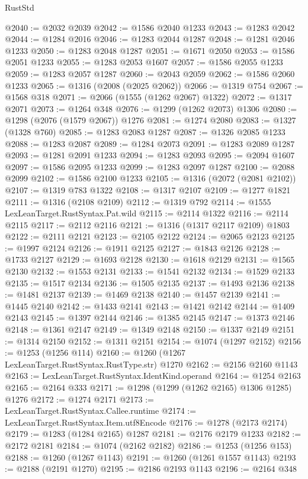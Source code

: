 \begin{lexlean}{RustStd}
\begin{coremodule}
@2040 := @2032 @2039
@2042 := @1586 @2040 @1233
@2043 := @1283 @2042
@2044 := @1284 @2016
@2046 := @1283 @2044 @1287
@2048 := @1281 @2046 @1233
@2050 := @1283 @2048 @1287
@2051 := @1671 @2050
@2053 := @1586 @2051 @1233
@2055 := @1283 @2053 @1607
@2057 := @1586 @2055 @1233
@2059 := @1283 @2057 @1287
@2060 := @2043 @2059
@2062 := @1586 @2060 @1233
@2065 := @1316 (@2008 (@2025 @2062))
@2066 := @1319 @754
@2067 := @1568 @318
@2071 := @2066 (@1555 (@1262 @2067) @1322)
@2072 := @1317 @2071
@2073 := @1264 @348
@2076 := @1299 (@1262 @2073) @1306
@2080 := @1298 (@2076 (@1579 @2067)) @1276
@2081 := @1274 @2080
@2083 := @1327 (@1328 @760)
@2085 := @1283 @2083 @1287
@2087 := @1326 @2085 @1233
@2088 := @1283 @2087
@2089 := @1284 @2073
@2091 := @1283 @2089 @1287
@2093 := @1281 @2091 @1233
@2094 := @1283 @2093
@2095 := @2094 @1607
@2097 := @1586 @2095 @1233
@2099 := @1283 @2097 @1287
@2100 := @2088 @2099
@2102 := @1586 @2100 @1233
@2105 := @1316 (@2072 (@2081 @2102))
@2107 := @1319 @783 @1322
@2108 := @1317 @2107
@2109 := @1277 @1821
@2111 := @1316 (@2108 @2109)
@2112 := @1319 @792
@2114 := @1555 LexLeanTarget.RustSyntax.Pat.wild
@2115 := @2114 @1322
@2116 := @2114 @2115
@2117 := @2112 @2116
@2121 := @1316 (@1317 @2117 @2109) @1803
@2122 := @2111 @2121
@2123 := @2105 @2122
@2124 := @2065 @2123
@2125 := @1997 @2124
@2126 := @1911 @2125
@2127 := @1843 @2126
@2128 := @1733 @2127
@2129 := @1693 @2128
@2130 := @1618 @2129
@2131 := @1565 @2130
@2132 := @1553 @2131
@2133 := @1541 @2132
@2134 := @1529 @2133
@2135 := @1517 @2134
@2136 := @1505 @2135
@2137 := @1493 @2136
@2138 := @1481 @2137
@2139 := @1469 @2138
@2140 := @1457 @2139
@2141 := @1445 @2140
@2142 := @1433 @2141
@2143 := @1421 @2142
@2144 := @1409 @2143
@2145 := @1397 @2144
@2146 := @1385 @2145
@2147 := @1373 @2146
@2148 := @1361 @2147
@2149 := @1349 @2148
@2150 := @1337 @2149
@2151 := @1314 @2150
@2152 := @1311 @2151
@2154 := @1074 (@1297 @2152)
@2156 := @1253 (@1256 @114)
@2160 := @1260 (@1267 LexLeanTarget.RustSyntax.RustType.str) @1270
@2162 := @2156 @2160 @1143
@2163 := LexLeanTarget.RustSyntax.IdentKind.operand
@2164 := @1254 @2163
@2165 := @2164 @333
@2171 := @1298 (@1299 (@1262 @2165) @1306 @1285) @1276
@2172 := @1274 @2171
@2173 := LexLeanTarget.RustSyntax.Callee.runtime
@2174 := LexLeanTarget.RustSyntax.Item.utf8Encode
@2176 := @1278 (@2173 @2174)
@2179 := @1283 (@1284 @2165) @1287
@2181 := @2176 @2179 @1233
@2182 := @2172 @2181
@2184 := @1074 (@2162 @2182)
@2186 := @1253 (@1256 @153)
@2188 := @1260 (@1267 @1143)
@2191 := @1260 (@1261 @1557 @1143)
@2193 := @2188 (@2191 @1270)
@2195 := @2186 @2193 @1143
@2196 := @2164 @348

\end{coremodule}
\end{lexlean}
